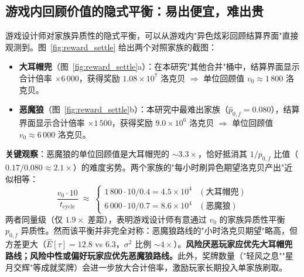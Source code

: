 \documentclass[journal]{IEEEtran}
\begin{document}
\subsection{游戏内回顾价值的隐式平衡：易出便宜，难出贵}

游戏设计师对家族异质性的隐式平衡，可以从游戏内"异色炫彩回顾结算界面"直接观测到。图~\ref{fig:reward_settle} 给出两个对照家族的截图：

\begin{itemize}
    \item \textbf{大耳帽兜}（图~\ref{fig:reward_settle}a）：在本研究"其他合并"桶中，结算界面显示合计倍率 $\times 6\,000$，获得奖励 $1.08 \times 10^7$ 洛克贝 $\Rightarrow$ 单位回顾值 $v_0 \approx 1\,800$ 洛克贝。
    \item \textbf{恶魔狼}（图~\ref{fig:reward_settle}b）：本研究中最难出家族（$\hat p_{0,f} = 0.080$），结算界面显示合计倍率 $\times 1\,500$，获得奖励 $9.0 \times 10^6$ 洛克贝 $\Rightarrow$ 单位回顾值 $v_0 \approx 6\,000$ 洛克贝。
\end{itemize}

\textbf{关键观察}：恶魔狼的单位回顾值是大耳帽兜的 $\sim 3.3 \times$，恰好抵消其 $1/p_{0,f}$ 比值（$0.17 / 0.080 \approx 2.1\times$）的难度劣势。两个家族的"每小时刷异色期望洛克贝产出"近似相等：
\[
\frac{v_0 \cdot 10}{t_{\text{cycle}}} \;\approx\;
\begin{cases} 1\,800 \cdot 10 / 0.4 = 4.5 \times 10^4 & (\text{大耳帽兜}) \\ 6\,000 \cdot 10 / 0.7 = 8.6 \times 10^4 & (\text{恶魔狼}) \end{cases}
\]
两者同量级（仅 $1.9\times$ 差距），表明游戏设计师有意通过 $v_0$ 的家族异质性平衡 $p_{0,f}$ 异质性。然而该平衡并非完全对称：恶魔狼路线的"小时洛克贝期望"略高，但方差更大（$\hat E[\tau] = 12.8$ vs $6.3$，$\sigma^2$ 比例 $\sim 4 \times$）。\textbf{风险厌恶玩家应优先大耳帽兜路线；风险中性或偏好玩家应优先恶魔狼路线。}此外，奖牌数量（"轻风之息""星月交辉"等成就奖牌）会进一步放大合计倍率，激励玩家长期投入单家族刷取。
\end{document}

